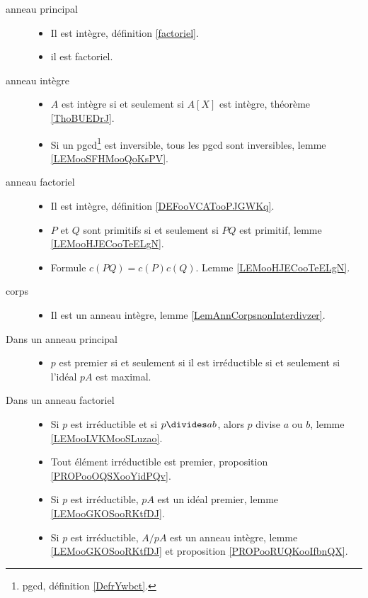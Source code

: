 \begin{description}
	\item[anneau principal]
		\begin{itemize}
			\item
			      Il est intègre, définition \ref{factoriel}.
			\item
			      il est factoriel\cite{BIBooENJGooWhQisg}.
		\end{itemize}
	\item[anneau intègre]
		\begin{itemize}
			\item
			      \( A\) est intègre si et seulement si \( A[X]\) est intègre, théorème \ref{ThoBUEDrJ}.
			\item
			      Si un pgcd\footnote{pgcd, définition \ref{DefrYwbct}.} est inversible, tous les pgcd sont inversibles, lemme \ref{LEMooSFHMooQoKsPV}.
		\end{itemize}
	\item[anneau factoriel]
		\begin{itemize}
			\item
			      Il est intègre, définition \ref{DEFooVCATooPJGWKq}.
			\item
			      \( P\) et \( Q\) sont primitifs si et seulement si \( PQ\) est primitif, lemme \ref{LEMooHJECooTeELgN}.
			\item
			      Formule \( c(PQ)=c(P)c(Q)\). Lemme \ref{LEMooHJECooTeELgN}.
		\end{itemize}
	\item[corps]
		\begin{itemize}
			\item
			      Il est un anneau intègre, lemme \ref{LemAnnCorpsnonInterdivzer}.
		\end{itemize}
\end{description}

\begin{description}
	\item[Dans un anneau principal]
		\begin{itemize}
			\item
			      \( p\) est premier si et seulement si il est irréductible si et seulement si l'idéal \( pA\) est maximal.
		\end{itemize}
	\item[Dans un anneau factoriel]
		\begin{itemize}
			\item
			      Si \( p\) est irréductible et si \( p\divides ab\), alors \( p\) divise \( a\) ou \( b\), lemme \ref{LEMooLVKMooSLuzao}.
			\item
			      Tout élément irréductible est premier, proposition \ref{PROPooOQSXooYidPQv}.
			\item
			      Si \( p\) est irréductible, \( pA\) est un idéal premier, lemme \ref{LEMooGKOSooRKtfDJ}.
			\item
			      Si \( p\) est irréductible, \( A/pA\) est un anneau intègre, lemme \ref{LEMooGKOSooRKtfDJ} et proposition \ref{PROPooRUQKooIfbnQX}.
		\end{itemize}
\end{description}



